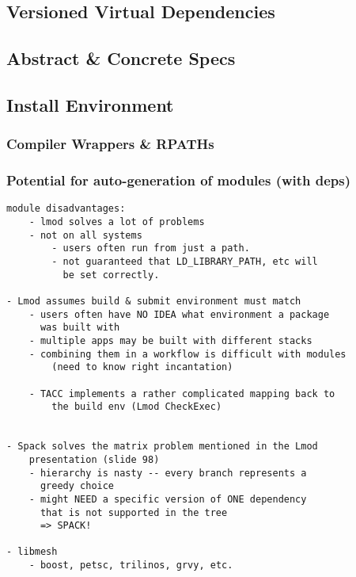 \subsection{Versioned Virtual Dependencies}

\subsection{Abstract \& Concrete Specs}
	
\subsection{Install Environment}

\subsubsection{Compiler Wrappers \& RPATHs}

\subsubsection{Potential for auto-generation of modules (with deps)}

\begin{verbatim}
module disadvantages:
	- lmod solves a lot of problems
	- not on all systems
		- users often run from just a path.
		- not guaranteed that LD_LIBRARY_PATH, etc will
		  be set correctly.

- Lmod assumes build & submit environment must match
	- users often have NO IDEA what environment a package
	  was built with
	- multiple apps may be built with different stacks
	- combining them in a workflow is difficult with modules
		(need to know right incantation)

	- TACC implements a rather complicated mapping back to
	    the build env (Lmod CheckExec)
	

- Spack solves the matrix problem mentioned in the Lmod
    presentation (slide 98)
	- hierarchy is nasty -- every branch represents a
	  greedy choice
	- might NEED a specific version of ONE dependency
	  that is not supported in the tree
	  => SPACK!

- libmesh
	- boost, petsc, trilinos, grvy, etc.
\end{verbatim}
